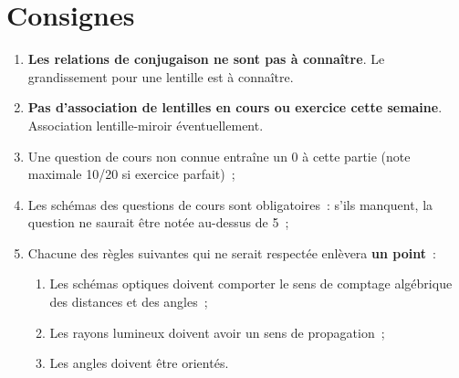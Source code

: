 \documentclass[a4paper, 12pt, final, garamond]{book}
\begin{document}
\section{Consignes}
\begin{enumerate}
    \item \textbf{Les relations de conjugaison ne sont pas à connaître}. Le
        grandissement pour une lentille est à connaître.
    \item \textbf{Pas d'association de lentilles en cours ou exercice cette
        semaine}. Association lentille-miroir éventuellement.
    \item Une question de cours non connue entraîne un 0 à cette partie (note
        maximale 10/20 si exercice parfait)~;
    \item Les schémas des questions de cours sont obligatoires~: s'ils manquent,
        la question ne saurait être notée au-dessus de 5~;
    \item Chacune des règles suivantes qui ne serait respectée enlèvera
        \textbf{un  point}~:
        \begin{enumerate}
            \item Les schémas optiques doivent comporter le sens de comptage
                algébrique des distances et des angles~;
            \item Les rayons lumineux doivent avoir un sens de propagation~;
            \item Les angles doivent être orientés.
        \end{enumerate}
\end{enumerate}
\end{document}
